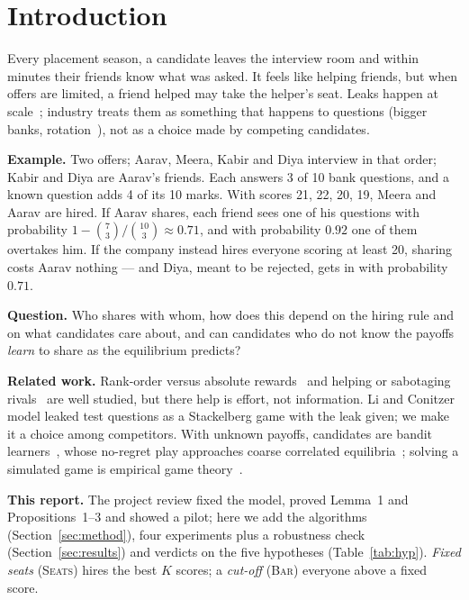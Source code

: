 \documentclass[conference]{IEEEtran}
\theoremstyle{plain}
\theoremstyle{definition}\newtheorem{definition}{Definition}
\newcommand{\seats}{\textsc{Seats}}\newcommand{\barr}{\textsc{Bar}}
\begin{document}
\section{Introduction}
Every placement season, a candidate leaves the interview room and within minutes their friends know what was asked. It feels like
helping friends, but when offers are limited, a friend helped may take the helper's seat. Leaks happen at scale~\cite{blind,glider};
industry treats them as something that happens to questions (bigger banks, rotation~\cite{glider}), not as a choice made by competing candidates.

\textbf{Example.} Two offers; Aarav, Meera, Kabir and Diya interview in that order; Kabir and Diya are Aarav's friends. Each answers 3 of 10 bank questions,
and a known question adds 4 of its 10 marks. With scores 21, 22, 20, 19, Meera and Aarav are hired. If Aarav shares, each friend sees one of his questions with
probability $1-\binom{7}{3}/\binom{10}{3}\approx0.71$, and with probability $0.92$ one of them overtakes him. If the company instead hires everyone scoring at least 20,
sharing costs Aarav nothing --- and Diya, meant to be rejected, gets in with probability $0.71$.

\textbf{Question.} Who shares with whom, how does this depend on the hiring rule and on what candidates care about, and can
candidates who do not know the payoffs \emph{learn} to share as the equilibrium predicts?

\textbf{Related work.} Rank-order versus absolute rewards~\cite{lazear} and helping or sabotaging rivals~\cite{krakel} are well
studied, but there help is effort, not information. Li and Conitzer~\cite{li} model leaked test questions as a Stackelberg game with
the leak given; we make it a choice among competitors. With unknown payoffs, candidates are bandit learners~\cite{ucb,exp3,thompson},
whose no-regret play approaches coarse correlated equilibria~\cite{hart}; solving a simulated game is empirical game theory~\cite{wellman}.

\textbf{This report.} The project review fixed the model, proved Lemma~1 and Propositions~1--3 and showed a pilot; here we add the algorithms (Section~\ref{sec:method}),
four experiments plus a robustness check (Section~\ref{sec:results}) and verdicts on the five hypotheses (Table~\ref{tab:hyp}).
\emph{Fixed seats} (\seats) hires the best $K$ scores; a \emph{cut-off} (\barr) everyone above a fixed score.

\end{document}
